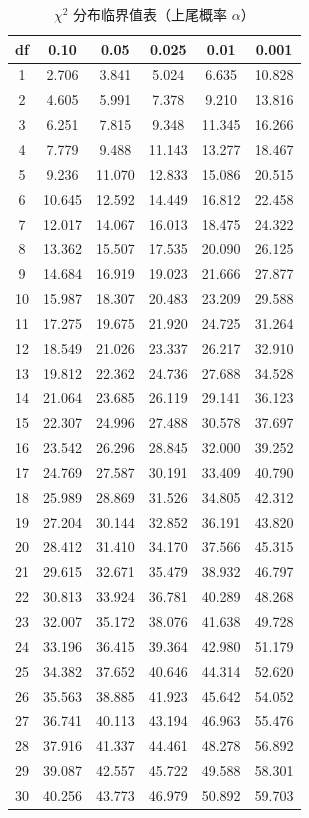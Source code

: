 \documentclass[lang=cn,10pt]{elegantbook}
\begin{document}
\begin{table}[H]
  \centering
  \caption{$\chi^2$ 分布临界值表（上尾概率 $\alpha$）}
  \small
  \begin{tabular}{c|ccccc}
    \toprule
    df & 0.10 & 0.05 & 0.025 & 0.01 & 0.001 \\
    \midrule
    1 & 2.706 & 3.841 & 5.024 & 6.635 & 10.828 \\
    2 & 4.605 & 5.991 & 7.378 & 9.210 & 13.816 \\
    3 & 6.251 & 7.815 & 9.348 & 11.345 & 16.266 \\
    4 & 7.779 & 9.488 & 11.143 & 13.277 & 18.467 \\
    5 & 9.236 & 11.070 & 12.833 & 15.086 & 20.515 \\
    6 & 10.645 & 12.592 & 14.449 & 16.812 & 22.458 \\
    7 & 12.017 & 14.067 & 16.013 & 18.475 & 24.322 \\
    8 & 13.362 & 15.507 & 17.535 & 20.090 & 26.125 \\
    9 & 14.684 & 16.919 & 19.023 & 21.666 & 27.877 \\
    10 & 15.987 & 18.307 & 20.483 & 23.209 & 29.588 \\
    11 & 17.275 & 19.675 & 21.920 & 24.725 & 31.264 \\
    12 & 18.549 & 21.026 & 23.337 & 26.217 & 32.910 \\
    13 & 19.812 & 22.362 & 24.736 & 27.688 & 34.528 \\
    14 & 21.064 & 23.685 & 26.119 & 29.141 & 36.123 \\
    15 & 22.307 & 24.996 & 27.488 & 30.578 & 37.697 \\
    16 & 23.542 & 26.296 & 28.845 & 32.000 & 39.252 \\
    17 & 24.769 & 27.587 & 30.191 & 33.409 & 40.790 \\
    18 & 25.989 & 28.869 & 31.526 & 34.805 & 42.312 \\
    19 & 27.204 & 30.144 & 32.852 & 36.191 & 43.820 \\
    20 & 28.412 & 31.410 & 34.170 & 37.566 & 45.315 \\
    21 & 29.615 & 32.671 & 35.479 & 38.932 & 46.797 \\
    22 & 30.813 & 33.924 & 36.781 & 40.289 & 48.268 \\
    23 & 32.007 & 35.172 & 38.076 & 41.638 & 49.728 \\
    24 & 33.196 & 36.415 & 39.364 & 42.980 & 51.179 \\
    25 & 34.382 & 37.652 & 40.646 & 44.314 & 52.620 \\
    26 & 35.563 & 38.885 & 41.923 & 45.642 & 54.052 \\
    27 & 36.741 & 40.113 & 43.194 & 46.963 & 55.476 \\
    28 & 37.916 & 41.337 & 44.461 & 48.278 & 56.892 \\
    29 & 39.087 & 42.557 & 45.722 & 49.588 & 58.301 \\
    30 & 40.256 & 43.773 & 46.979 & 50.892 & 59.703 \\
    \bottomrule
  \end{tabular}
\end{table}
\end{document}
